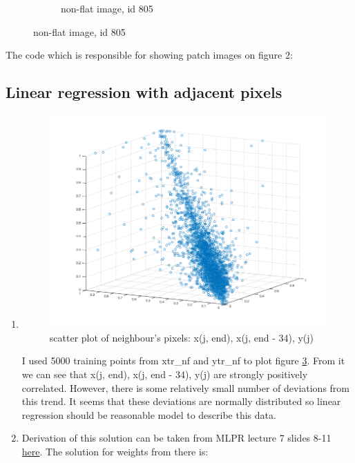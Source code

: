 \documentclass{article}
\begin{document}
\begin{enumerate}[label=(\alph*)]
\begin{figure}[t]
\begin{subfigure}{0.5\textwidth}
											      	\caption{non-flat image, id 805}
											      	\label{fig:non-flat_patch_image}
						\end{subfigure}%
				 	\end{figure}
					 The code which is responsible for showing patch images on figure 2:
				 	 
			\end{enumerate}		
		\subsection{Linear regression with adjacent pixels}
			\begin{enumerate}[label=(\alph*)]
				\item
				 	\begin{figure}[htp]
				 		\centering
				 		\includegraphics[width=12cm]{images/p1-2-a_closest_pixels}
				 		\caption{scatter plot of neighbour's pixels: x(j, end), x(j, end - 34), y(j)}
				 		\label{fig:p1-2-a_closest_pixels}
				 	\end{figure}
					I used 5000 training points from xtr\_nf and ytr\_nf to plot figure \ref{fig:p1-2-a_closest_pixels}. From it we can see that x(j, end), x(j, end - 34), y(j) are strongly positively correlated. However, there is some relatively small number of deviations from this trend. It seems that these deviations are normally distributed so linear regression should be reasonable model to describe this data.
				\item
					Derivation of this solution can be taken from MLPR lecture 7 slides 8-11 \href{http://www.inf.ed.ac.uk/teaching/courses/mlpr/2015/slides/07_regression.pdf}{here}. The solution for weights from there is:

\end{enumerate}
\end{document}
